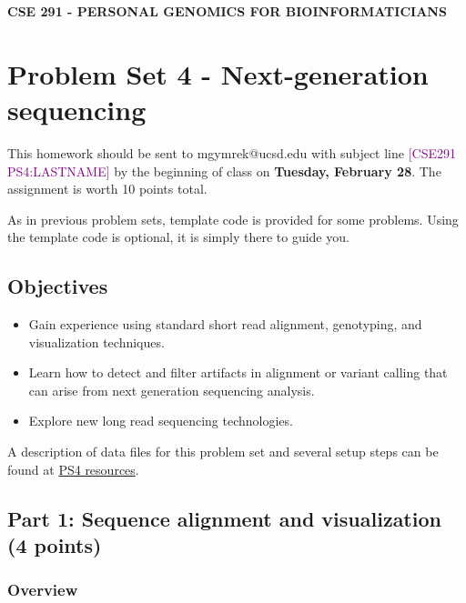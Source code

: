 \documentclass[12pt]{article}
\begin{document}
\textbf{CSE 291 - PERSONAL GENOMICS FOR BIOINFORMATICIANS}

\section*{Problem Set 4 - Next-generation sequencing}

This homework should be sent to mgymrek@ucsd.edu with subject line \textcolor{purple}{[CSE291 PS4:LASTNAME]} by the beginning of class on \textbf{Tuesday, February 28}. The assignment is worth 10 points total.

As in previous problem sets, template code is provided for some problems. Using the template code is optional, it is simply there to guide you.

\subsection*{Objectives}
\begin{itemize}
\item Gain experience using standard short read alignment, genotyping, and visualization techniques.
\item Learn how to detect and filter artifacts in alignment or variant calling that can arise from next generation sequencing analysis.
\item Explore new long read sequencing technologies.
\end{itemize}

A description of data files for this problem set and several setup steps can be found at \href{https://gymreklab.github.io/teaching/personal\_genomics/ps4\_resources.html}{PS4 resources}. 

\subsection*{Part 1: Sequence alignment and visualization (4 points)}
\subsubsection*{Overview}
\end{document}
